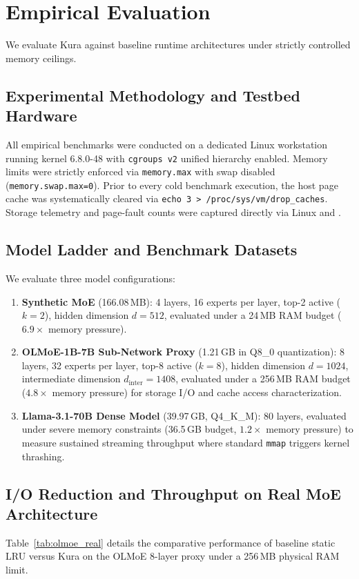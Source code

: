 \section{Empirical Evaluation}
\label{sec:evaluation}

We evaluate Kura against baseline runtime architectures under strictly controlled memory ceilings.

\subsection{Experimental Methodology and Testbed Hardware}
All empirical benchmarks were conducted on a dedicated Linux workstation running kernel 6.8.0-48 with \texttt{cgroups v2} unified hierarchy enabled. Memory limits were strictly enforced via \texttt{memory.max} with swap disabled (\texttt{memory.swap.max=0}). Prior to every cold benchmark execution, the host page cache was systematically cleared via \texttt{echo 3 > /proc/sys/vm/drop\_caches}. Storage telemetry and page-fault counts were captured directly via Linux  and .

\subsection{Model Ladder and Benchmark Datasets}
We evaluate three model configurations:
\begin{enumerate}
    \item \textbf{Synthetic MoE} (166.08\,MB): 4 layers, 16 experts per layer, top-2 active ($k=2$), hidden dimension $d=512$, evaluated under a 24\,MB RAM budget ($6.9\times$ memory pressure).
    \item \textbf{OLMoE-1B-7B Sub-Network Proxy} (1.21\,GB in Q8\_0 quantization): 8 layers, 32 experts per layer, top-8 active ($k=8$), hidden dimension $d=1024$, intermediate dimension $d_{\text{inter}}=1408$, evaluated under a 256\,MB RAM budget ($4.8\times$ memory pressure) for storage I/O and cache access characterization.
    \item \textbf{Llama-3.1-70B Dense Model} (39.97\,GB, Q4\_K\_M): 80 layers, evaluated under severe memory constraints (36.5\,GB budget, $1.2\times$ memory pressure) to measure sustained streaming throughput where standard \texttt{mmap} triggers kernel thrashing.
\end{enumerate}

\subsection{I/O Reduction and Throughput on Real MoE Architecture}
Table~\ref{tab:olmoe_real} details the comparative performance of baseline static LRU versus Kura on the OLMoE 8-layer proxy under a 256\,MB physical RAM limit.

